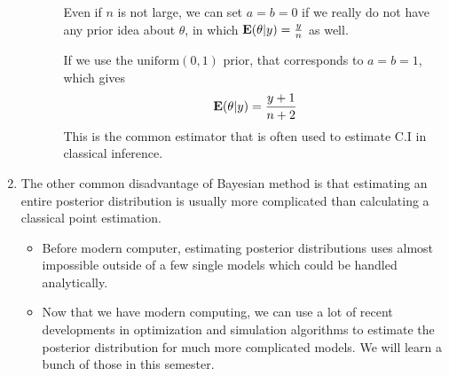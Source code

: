 \begin{enumerate}
\begin{itemize}
\begin{itemize}
            Even if $n$ is not large, we can set $a = b = 0$ if we really do not have any prior idea about $\theta$, in which ${\mathbf E}(\theta| y) = \frac{y}{n}$ as well.
            
            If we use the $\text{uniform}(0, 1)$ prior, that corresponds to $a=b=1$, which gives
            \[
                {\mathbf E}(\theta| y) = \frac{y+1}{n+2}
            \]
            This is the common estimator that is often used to estimate C.I in classical inference.
        \end{itemize}
    \end{itemize}
    \item The other common disadvantage of Bayesian method is that estimating an entire posterior distribution is usually more complicated than calculating a classical point estimation.

    \begin{itemize}
        \item Before modern computer, estimating posterior distributions uses almost \\impossible outside of a few single models which could be handled analytically.
        \item Now that we have modern computing, we can use a lot of recent developments in optimization and simulation algorithms to estimate the posterior distribution for much more complicated models. We will learn a bunch of those in this semester.
    \end{itemize}

\end{enumerate}

